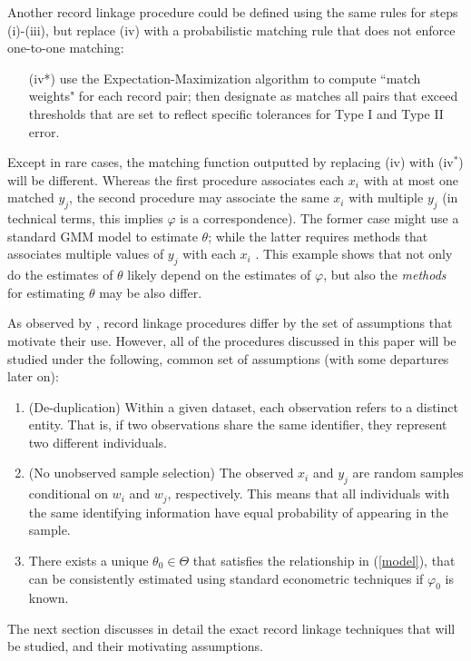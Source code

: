 \documentclass[12pt]{article}
\begin{document}
Another record linkage procedure could be defined using the same rules for steps (i)-(iii), but replace (iv) with a probabilistic matching rule that does not enforce one-to-one matching:
\begin{enumerate}
\item[(iv*)]  use the Expectation-Maximization algorithm to compute ``match weights" for each record pair; then designate as matches all pairs that exceed thresholds that are set to reflect specific tolerances for Type I and Type II error.
\end{enumerate} 

Except in rare cases, the matching function outputted by replacing (iv) with (iv$^*$) will be different.  Whereas the first procedure associates each $x_i$ with at most one matched $y_j$, the second procedure may associate the same $x_i$ with multiple $y_j$ (in technical terms, this implies $\varphi$ is a correspondence).  The former case might use a standard GMM model to estimate $\theta$; while the latter requires methods that associates multiple values of $y_j$ with each $x_i$ \citep{ahl2019}.  This example shows that not only do the estimates of $\theta$ likely depend on the estimates of $\varphi$, but also the \textit{methods} for estimating $\theta$ may be also differ. 

As observed by \cite{bailey2017}, record linkage procedures differ by the set of assumptions that motivate their use.  However, all of the procedures discussed in this paper will be studied under the following, common set of assumptions (with some departures later on):
\begin{enumerate}
\item (De-duplication) Within a given dataset, each observation refers to a distinct entity.  That is, if two observations share the same identifier, they represent two different individuals.
\item (No unobserved sample selection) The observed $x_i$ and $y_j$ are random samples conditional on $w_i$ and $w_j$, respectively.  This means that all individuals with the same identifying information have equal probability of appearing in the sample. 
\item There exists a unique $\theta_0 \in \Theta$ that satisfies the relationship in (\ref{model}), that can be consistently estimated using standard econometric techniques if $\varphi_0$ is known.
\end{enumerate}

The next section discusses in detail the exact record linkage techniques that will be studied, and their motivating assumptions.
\end{document}
